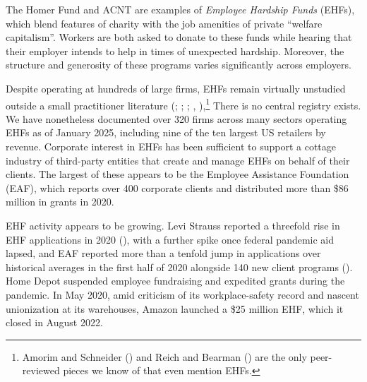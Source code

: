 \documentclass[
  11pt,
  oneside]{article}
\begin{document}
The Homer Fund and ACNT are examples of \emph{Employee Hardship Funds} (EHFs), which blend features of charity with the job amenities of private ``welfare capitalism''. Workers are both asked to donate to these funds while hearing that their employer intends to help in times of unexpected hardship. Moreover, the structure and generosity of these programs varies significantly across employers.

Despite operating at hundreds of large firms, EHFs remain virtually unstudied outside a small practitioner literature (; ; ; , ),\footnote{Amorim and Schneider () and Reich and Bearman () are the only peer-reviewed pieces we know of that even mention EHFs.} There is no central registry exists. We have nonetheless documented over 320 firms across many sectors operating EHFs as of January 2025, including nine of the ten largest US retailers by revenue. Corporate interest in EHFs has been sufficient to support a cottage industry of third-party entities that create and manage EHFs on behalf of their clients. The largest of these appears to be the Employee Assistance Foundation (EAF), which reports over 400 corporate clients and distributed more than \$86 million in grants in 2020.

EHF activity appears to be growing. Levi Strauss reported a threefold rise in EHF applications in 2020 (), with a further spike once federal pandemic aid lapsed, and EAF reported more than a tenfold jump in applications over historical averages in the first half of 2020 alongside 140 new client programs (). Home Depot suspended employee fundraising and expedited grants during the pandemic. In May 2020, amid criticism of its workplace-safety record and nascent unionization at its warehouses, Amazon launched a \$25 million EHF, which it closed in August 2022.
\end{document}
